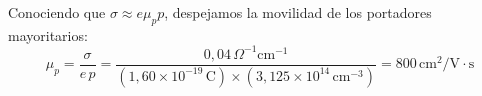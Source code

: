 \begin{problema}
Conociendo que $\sigma \approx e \mu_p p$, despejamos la movilidad de los portadores mayoritarios:
\[
\mu_p = \frac{\sigma}{e \, p} = \frac{0,04\,\Omega^{-1}\text{cm}^{-1}}{(1,60 \times 10^{-19}\,\text{C}) \times (3,125 \times 10^{14}\,\text{cm}^{-3})} = 800\,\text{cm}^2/\text{V}\cdot\text{s}
\]
\end{problema}